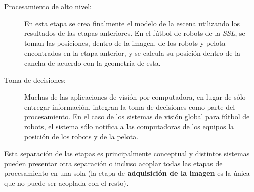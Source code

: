 \begin{description}
	\item[Procesamiento de alto nivel:] En esta etapa se crea finalmente el
		modelo de la escena utilizando los resultados de las etapas
		anteriores. En el fútbol de robots de la \emph{SSL}, se toman
		las posiciones, dentro de la imagen, de los robots y pelota
		encontrados en la etapa anterior, y se calcula su posición
		dentro de la cancha de acuerdo con la geometría de esta.

	\item[Toma de decisiones:] Muchas de las aplicaciones de visión por
		computadora, en lugar de sólo entregar información, integran la
		toma de decisiones como parte del procesamiento. En el caso de
		los sistemas de visión global para fútbol de robots, el sistema
		sólo notifica a las computadoras de los equipos la posición de
		los robots y de la pelota.

\end{description}

Esta separación de las etapas es principalmente conceptual y distintos sistemas
pueden presentar otra separación o incluso acoplar todas las etapas de
procesamiento en una sola (la etapa de \textbf{adquisición de la imagen} es la
única que no puede ser acoplada con el resto).
